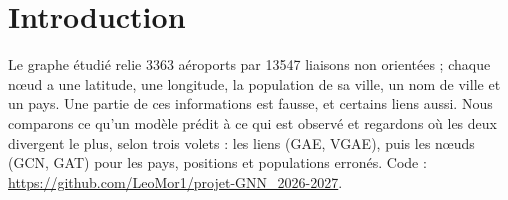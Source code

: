 \section{Introduction}
\label{sec:intro}

Le graphe étudié relie 3363 aéroports par 13547 liaisons non orientées ; chaque nœud a une latitude, une longitude, la population de sa ville, un nom de ville et un pays. Une partie de ces informations est fausse, et certains liens aussi. Nous comparons ce qu'un modèle prédit à ce qui est observé et regardons où les deux divergent le plus, selon trois volets : les liens (GAE, VGAE), puis les nœuds (GCN, GAT) pour les pays, positions et populations erronés. Code : \url{https://github.com/LeoMor1/projet-GNN_2026-2027}.
